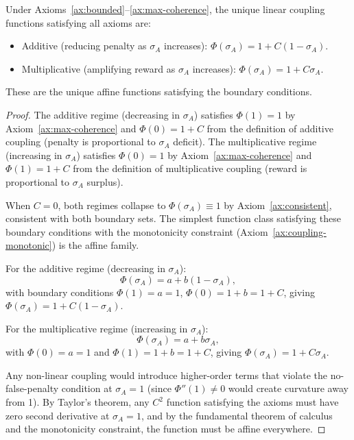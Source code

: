 \begin{proposition}
\label{prop:coupling-unique}
Under Axioms~\ref{ax:bounded}--\ref{ax:max-coherence}, the unique
linear coupling functions satisfying all axioms are:
\begin{itemize}
\item Additive (reducing penalty as $\sigma_A$ increases):
  $\Phi(\sigma_A) = 1 + C(1 - \sigma_A)$.
\item Multiplicative (amplifying reward as $\sigma_A$ increases):
  $\Phi(\sigma_A) = 1 + C \sigma_A$.
\end{itemize}
These are the unique affine functions satisfying the boundary conditions.
\end{proposition}

\begin{proof}
The additive regime (decreasing in $\sigma_A$) satisfies
$\Phi(1) = 1$ by Axiom~\ref{ax:max-coherence} and
$\Phi(0) = 1 + C$ from the definition of additive coupling
(penalty is proportional to $\sigma_A$ deficit). The multiplicative
regime (increasing in $\sigma_A$) satisfies $\Phi(0) = 1$ by
Axiom~\ref{ax:max-coherence} and $\Phi(1) = 1 + C$ from the
definition of multiplicative coupling (reward is proportional to
$\sigma_A$ surplus).

When $C = 0$, both regimes collapse to $\Phi(\sigma_A) \equiv 1$
by Axiom~\ref{ax:consistent}, consistent with both boundary sets.
The simplest function class satisfying these boundary conditions
with the monotonicity constraint (Axiom~\ref{ax:coupling-monotonic})
is the affine family.

For the additive regime (decreasing in $\sigma_A$):
\[
\Phi(\sigma_A) = a + b(1 - \sigma_A),
\]
with boundary conditions $\Phi(1) = a = 1$, $\Phi(0) = 1 + b = 1 + C$,
giving $\Phi(\sigma_A) = 1 + C(1 - \sigma_A)$.

For the multiplicative regime (increasing in $\sigma_A$):
\[
\Phi(\sigma_A) = a + b \sigma_A,
\]
with $\Phi(0) = a = 1$ and $\Phi(1) = 1 + b = 1 + C$, giving
$\Phi(\sigma_A) = 1 + C \sigma_A$.

Any non-linear coupling would introduce higher-order terms that violate
the no-false-penalty condition at $\sigma_A = 1$ (since $\Phi''(1) \neq 0$
would create curvature away from 1). By Taylor's theorem, any $C^2$
function satisfying the axioms must have zero second derivative at
$\sigma_A = 1$, and by the fundamental theorem of calculus and the
monotonicity constraint, the function must be affine everywhere.
\end{proof}

